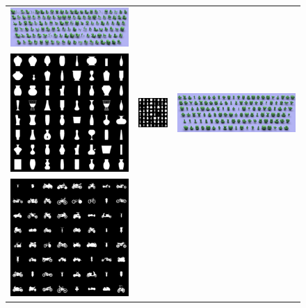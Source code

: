 \begin{figure}
\begin{center}
\begin{tabular}{ccc}
    \includegraphics[height=\fh]{fig/chair/output.png} \\
    \includegraphics[height=\fh]{fig/vase/samples.png} & 
    \includegraphics[height=\fh]{fig/vase/450.png} & 
    \includegraphics[height=\fh]{fig/vase/output.png} \\
    \includegraphics[height=\fh]{fig/bike/samples.png} & 

\end{tabular}
\end{center}
\end{figure}
